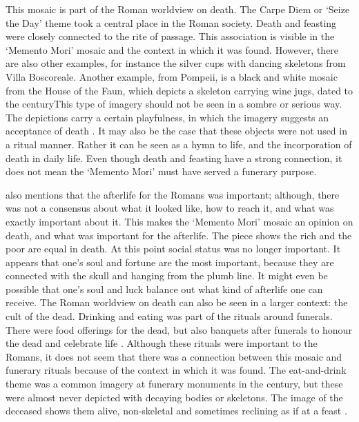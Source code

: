 This mosaic is part of the Roman worldview on death. The Carpe Diem or ‘Seize the Day’ theme took a central place in the Roman society. Death and feasting were closely 
connected to the rite of passage. This association is visible in the ‘Memento Mori’ mosaic and the context in which it was found. However, there are also other examples, for instance the silver cups with dancing skeletons from Villa Boscoreale. Another example, from Pompeii, is a black and white mosaic from the House of the Faun, which depicts a skeleton carrying wine jugs, dated to the  century\AD This type of imagery should not be seen in a sombre or serious way.  The depictions carry a certain playfulness, in which the imagery suggests an acceptance of death \parencite[25--27, 85--87]{Hope_2009}. It may also be the case that these objects were not used in a ritual manner. 
Rather it can be seen as a hymn to life, and the incorporation of death in daily life. Even though death and feasting have a strong connection, it does not mean the ‘Memento Mori’ must have served a funerary purpose. 

	\textcite{Hope_2009} also mentions that the afterlife for the Romans was important; although, there was not a consensus about what it looked like, how to reach it, and what was exactly important about it. This makes the ‘Memento Mori’ mosaic an opinion on death, and what was important for the afterlife.
	The piece shows the rich and the poor are equal in death. 
At this point social status was no longer important. It appears that one’s soul and fortune are the most important, because they are connected with the skull and hanging from the plumb line. 
It might even be possible that one’s soul and luck balance out what kind of afterlife one can receive.
	The Roman worldview on death can also be seen in a larger context: the cult of the dead. Drinking and eating was part of the rituals around funerals. 
There were food offerings for the dead, but also banquets after funerals to honour the dead and celebrate life \parencite[121--123]{Erasmo_2012}. 
Although these rituals were important to the Romans, it does not seem that there was a connection between this mosaic and funerary rituals because of the context in which it was found. The eat-and-drink theme was a common imagery at funerary monuments in the  century\AD, but these were almost never depicted with decaying bodies or skeletons. The image of the deceased shows them alive, non-skeletal and sometimes reclining as if at a feast \parencite[38]{Hope_2009}.

